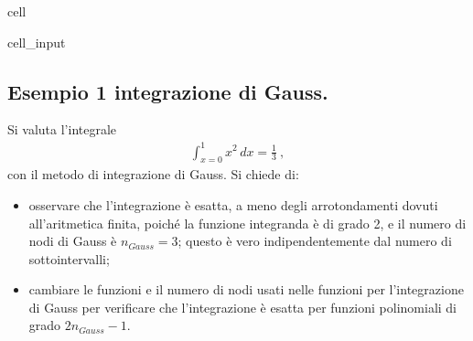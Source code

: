 \documentclass[letterpaper,10pt,italian]{jupyterBook}
\begin{document}
\begin{sphinxuseclass}{cell}
\begin{sphinxVerbatimInput}
\begin{sphinxuseclass}{cell_input}
\begin{sphinxVerbatim}[commandchars=\\\{\}]
     \PYG{p}{[}   \PYG{p}{[}\PYG{p}{]} \PYG{p}{[}\PYG{p}{]}     \PYG{p}{]}
\end{sphinxVerbatim}

\end{sphinxuseclass}\end{sphinxVerbatimInput}

\end{sphinxuseclass}

\subsection{Esempio 1 \sphinxhyphen{} integrazione di Gauss.}
\label{\detokenize{ch/numerics/integrals:esempio-1-integrazione-di-gauss}}
\sphinxAtStartPar
Si valuta l’integrale
\begin{equation*}
\begin{split}\int_{x = 0}^{1} x^2 \, dx = \frac{1}{3} \ ,\end{split}
\end{equation*}
\sphinxAtStartPar
con il metodo di integrazione di Gauss.
Si chiede di:
\begin{itemize}
\item {} 
\sphinxAtStartPar
osservare che l’integrazione è esatta, a meno degli arrotondamenti dovuti all’aritmetica finita,
poiché la funzione integranda è di grado 2, e il numero di nodi di Gauss è \(n_{Gauss} = 3\); questo è vero indipendentemente dal numero di sotto\sphinxhyphen{}intervalli;

\item {} 
\sphinxAtStartPar
cambiare le funzioni e il numero di nodi usati nelle funzioni per l’integrazione di Gauss per verificare che l’integrazione è esatta per funzioni polinomiali di grado \(2 n_{Gauss} - 1\).

\end{itemize}
\end{document}
